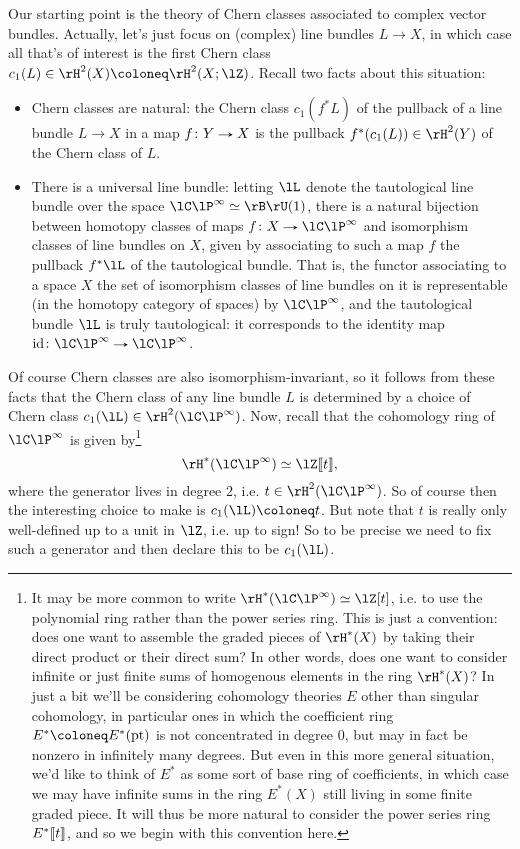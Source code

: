Our starting point is the theory of Chern classes associated to
complex vector bundles. Actually, let's just focus on (complex) line
bundles $L \to X$, in which case all that's of interest is the first
Chern class $c_1(L) \in \rH^2(X) \ce \rH^2(X;\lZ)$. Recall two facts
about this situation:
\begin{itemize}
\item Chern classes are natural: the Chern class $c_1(f^*L)$ of the
  pullback of a line bundle $L \to X$ in a map $f \c Y \to X$ is the
  pullback $f^*(c_1(L)) \in \rH^2(Y)$ of the Chern class of $L$.
\item There is a universal line bundle: letting $\lL$ denote the
  tautological line bundle over the space $\CP^\infty \iso \rB\rU(1)$,
  there is a natural bijection between homotopy classes of maps
  $f \c X \to \CP^\infty$ and isomorphism classes of line bundles on
  $X$, given by associating to such a map $f$ the pullback $f^*\lL$ of
  the tautological bundle. That is, the functor associating to a space
  $X$ the set of isomorphism classes of line bundles on it is
  representable (in the homotopy category of spaces) by $\CP^\infty$,
  and the tautological bundle $\lL$ is truly tautological: it
  corresponds to the identity map $\id \c \CP^\infty \to \CP^\infty$.
\end{itemize}
Of course Chern classes are also isomorphism-invariant, so it follows
from these facts that the Chern class of any line bundle $L$ is
determined by a choice of Chern class
$c_1(\lL) \in \rH^2(\CP^\infty)$. Now, recall that the cohomology ring
of $\CP^\infty$ is given by\footnote{It may be more common to write
  $\rH^*(\CP^\infty) \iso \lZ[t]$, i.e. to use the polynomial ring
  rather than the power series ring. This is just a convention: does
  one want to assemble the graded pieces of $\rH^*(X)$ by taking their
  direct product or their direct sum? In other words, does one want to
  consider infinite or just finite sums of homogenous elements in the
  ring $\rH^*(X)$? In just a bit we'll be considering cohomology
  theories $E$ other than singular cohomology, in particular ones in
  which the coefficient ring $E^* \ce E^*(\pt)$ is not concentrated in
  degree $0$, but may in fact be nonzero in infinitely many
  degrees. But even in this more general situation, we'd like to think
  of $E^*$ as some sort of base ring of coefficients, in which case we
  may have infinite sums in the ring $E^*(X)$ still living in some
  finite graded piece. It will thus be more natural to consider the
  power series ring $E^* \llbracket t \rrbracket$, and so we begin with this
  convention here.}
\[
\rH^*(\CP^\infty) \iso \lZ \ldb t \rdb,
\]
where the generator lives in degree $2$, i.e.
$t \in \rH^2(\CP^\infty)$. So of course then the interesting choice to
make is $c_1(\lL) \ce t$. But note that $t$ is really only
well-defined up to a unit in $\lZ$, i.e. up to sign! So to be precise
we need to fix such a generator and then declare this to be
$c_1(\lL)$.

